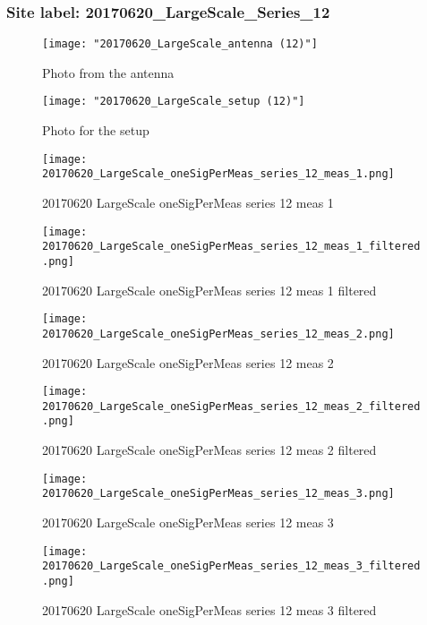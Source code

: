 \subsubsection{Site label: 20170620\_LargeScale\_Series\_12}
\begin{figure}[ht] \caption{Photo from the antenna}
\texttt{[image: "20170620\_LargeScale\_antenna (12)"]}\centering\end{figure}
\begin{figure}[ht] \caption{Photo for the setup}
\texttt{[image: "20170620\_LargeScale\_setup (12)"]}\centering\end{figure}
\begin{figure}[ht] \caption{20170620 LargeScale oneSigPerMeas series 12 meas 1}
\texttt{[image: 20170620\_LargeScale\_oneSigPerMeas\_series\_12\_meas\_1.png]}\centering\end{figure}
\begin{figure}[ht] \caption{20170620 LargeScale oneSigPerMeas series 12 meas 1 filtered}
\texttt{[image: 20170620\_LargeScale\_oneSigPerMeas\_series\_12\_meas\_1\_filtered.png]}\centering\end{figure}
\begin{figure}[ht] \caption{20170620 LargeScale oneSigPerMeas series 12 meas 2}
\texttt{[image: 20170620\_LargeScale\_oneSigPerMeas\_series\_12\_meas\_2.png]}\centering\end{figure}
\begin{figure}[ht] \caption{20170620 LargeScale oneSigPerMeas series 12 meas 2 filtered}
\texttt{[image: 20170620\_LargeScale\_oneSigPerMeas\_series\_12\_meas\_2\_filtered.png]}\centering\end{figure}
\begin{figure}[ht] \caption{20170620 LargeScale oneSigPerMeas series 12 meas 3}
\texttt{[image: 20170620\_LargeScale\_oneSigPerMeas\_series\_12\_meas\_3.png]}\centering\end{figure}
\begin{figure}[ht] \caption{20170620 LargeScale oneSigPerMeas series 12 meas 3 filtered}
\texttt{[image: 20170620\_LargeScale\_oneSigPerMeas\_series\_12\_meas\_3\_filtered.png]}\centering\end{figure}
\clearpage
